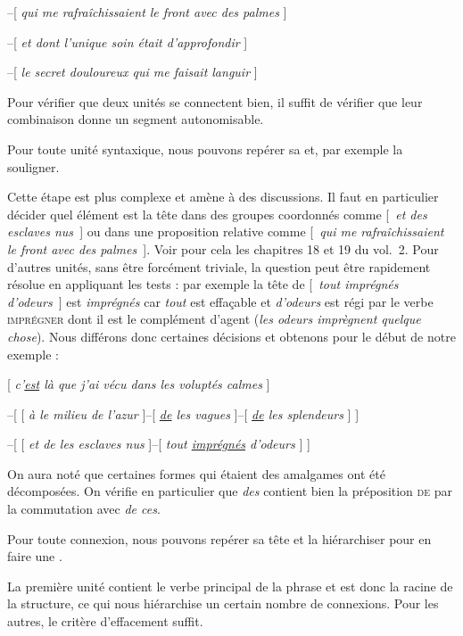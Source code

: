 –[ \textit{qui me rafraîchissaient le front avec des palmes} ]

–[ \textit{et dont l’unique soin était d’approfondir} ]

–[ \textit{le secret douloureux qui me faisait languir} ]
\z

Pour vérifier que deux unités se connectent bien, il suffit de vérifier que leur combinaison donne un segment autonomisable.

\begin{tblsframed}{}
\noindent Pour toute unité syntaxique, nous pouvons repérer sa  et, par exemple la souligner.
\end{tblsframed}

Cette étape est plus complexe et amène à des discussions. Il faut en particulier décider quel élément est la tête dans des groupes coordonnés comme [~\textit{et des esclaves nus~}] ou dans une proposition relative comme [~\textit{qui me rafraîchissaient le front avec des palmes~}]. Voir pour cela les  chapitres 18 et 19 du vol.\ 2. %
Pour d’autres unités, sans être forcément triviale, la question peut être rapidement résolue en appliquant les tests : par exemple la tête de [~\textit{tout imprégnés d’odeurs~}] est \textit{imprégnés} car \textit{tout} est effaçable et \textit{d’odeurs} est régi par le verbe \textsc{imprégner} dont il est le complément d’agent (\textit{les odeurs imprègnent quelque chose}). Nous différons donc certaines décisions et obtenons pour le début de notre exemple :

\ea{}
[ \textit{c’\uline{est} là que j’ai vécu dans les voluptés calmes} ]

–[ [ \textit{à le milieu de l’azur} ]–[ \textit{\uline{de} les vagues} ]–[ \textit{\uline{de} les splendeurs} ] ]

–[ [ \textit{et de les esclaves nus} ]–[ \textit{tout \uline{imprégnés} d’odeurs} ] ]
\z

On aura noté que certaines formes qui étaient des amalgames ont été décomposées. On vérifie en particulier que \textit{des} contient bien la préposition \textsc{de} par la commutation avec \textit{de ces}.

\begin{tblsframed}{}
\noindent Pour toute connexion, nous pouvons repérer sa tête et la hiérarchiser pour en faire une .
\end{tblsframed}

La première unité contient le verbe principal de la phrase et est donc la racine de la structure, ce qui nous hiérarchise un certain nombre de connexions. Pour les autres, le critère d’effacement suffit.

